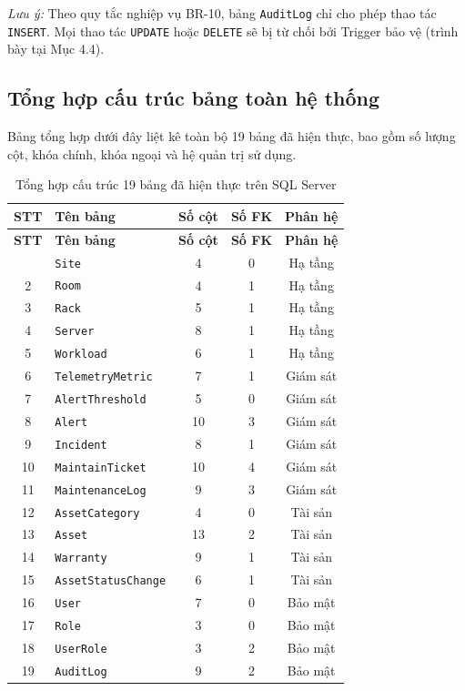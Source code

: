 \noindent\textit{Lưu ý:} Theo quy tắc nghiệp vụ BR-10, bảng \texttt{AuditLog} chỉ cho phép thao tác \texttt{INSERT}. Mọi thao tác \texttt{UPDATE} hoặc \texttt{DELETE} sẽ bị từ chối bởi Trigger bảo vệ (trình bày tại Mục 4.4).

\subsection{Tổng hợp cấu trúc bảng toàn hệ thống}

Bảng tổng hợp dưới đây liệt kê toàn bộ 19 bảng đã hiện thực, bao gồm số lượng cột, khóa chính, khóa ngoại và hệ quản trị sử dụng.

\begin{longtable}{|c|l|c|c|c|}
\caption{Tổng hợp cấu trúc 19 bảng đã hiện thực trên SQL Server} \label{tab:tonghop_bang} \\
\hline
\textbf{STT} & \textbf{Tên bảng} & \textbf{Số cột} & \textbf{Số FK} & \textbf{Phân hệ} \\ \hline
\endfirsthead
\hline
\textbf{STT} & \textbf{Tên bảng} & \textbf{Số cột} & \textbf{Số FK} & \textbf{Phân hệ} \\ \hline
\endhead
\hline
\endfoot
1 & \texttt{Site} & 4 & 0 & Hạ tầng \\ \hline
2 & \texttt{Room} & 4 & 1 & Hạ tầng \\ \hline
3 & \texttt{Rack} & 5 & 1 & Hạ tầng \\ \hline
4 & \texttt{Server} & 8 & 1 & Hạ tầng \\ \hline
5 & \texttt{Workload} & 6 & 1 & Hạ tầng \\ \hline
6 & \texttt{TelemetryMetric} & 7 & 1 & Giám sát \\ \hline
7 & \texttt{AlertThreshold} & 5 & 0 & Giám sát \\ \hline
8 & \texttt{Alert} & 10 & 3 & Giám sát \\ \hline
9 & \texttt{Incident} & 8 & 1 & Giám sát \\ \hline
10 & \texttt{MaintainTicket} & 10 & 4 & Giám sát \\ \hline
11 & \texttt{MaintenanceLog} & 9 & 3 & Giám sát \\ \hline
12 & \texttt{AssetCategory} & 4 & 0 & Tài sản \\ \hline
13 & \texttt{Asset} & 13 & 2 & Tài sản \\ \hline
14 & \texttt{Warranty} & 9 & 1 & Tài sản \\ \hline
15 & \texttt{AssetStatusChange} & 6 & 1 & Tài sản \\ \hline
16 & \texttt{User} & 7 & 0 & Bảo mật \\ \hline
17 & \texttt{Role} & 3 & 0 & Bảo mật \\ \hline
18 & \texttt{UserRole} & 3 & 2 & Bảo mật \\ \hline
19 & \texttt{AuditLog} & 9 & 2 & Bảo mật \\ \hline
\end{longtable}

